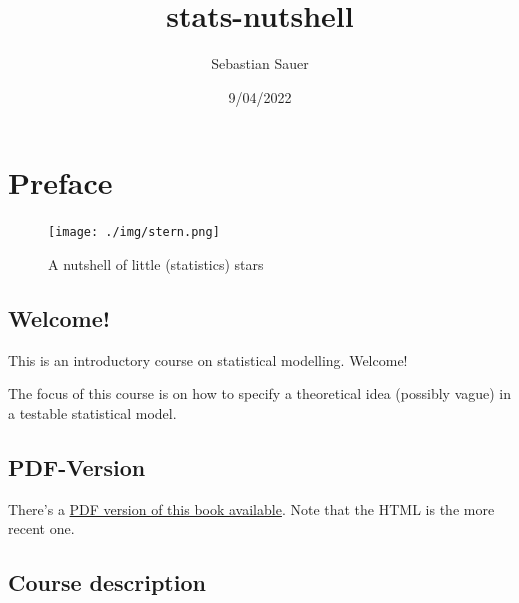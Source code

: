 \documentclass[
  letterpaper,
  DIV=11,
  numbers=noendperiod]{scrreprt}
\title{stats-nutshell}
\author{Sebastian Sauer}
\date{9/04/2022}
\renewcommand*\contentsname{Table of contents}
\newcommand\contentsname{Table of contents}
\theoremstyle{definition}
\theoremstyle{definition}
\theoremstyle{remark}
\begin{document}
\maketitle
\ifdefined\Shaded\renewenvironment{Shaded}{\begin{tcolorbox}[interior hidden, borderline west={3pt}{0pt}{shadecolor}, enhanced, breakable, sharp corners, boxrule=0pt, frame hidden]}{\end{tcolorbox}}\fi

\renewcommand*\contentsname{Table of contents}
{
\hypersetup{linkcolor=}
\setcounter{tocdepth}{2}
\tableofcontents
}

\hypertarget{preface}{%
\chapter*{Preface}\label{preface}}

\begin{figure}

{\centering \texttt{[image: ./img/stern.png]}

}

\caption{A nutshell of little (statistics) stars}

\end{figure}

\hypertarget{welcome}{%
\section*{Welcome!}\label{welcome}}

This is an introductory course on statistical modelling. Welcome!

The focus of this course is on how to specify a theoretical idea
(possibly vague) in a testable statistical model.

\hypertarget{pdf-version}{%
\section*{PDF-Version}\label{pdf-version}}

There's a
\href{https://stats-nutshell.netlify.app/stats-nutshell.pdf}{PDF version
of this book available}. Note that the HTML is the more recent one.

\hypertarget{course-description}{%
\section*{Course description}\label{course-description}}
\end{document}
